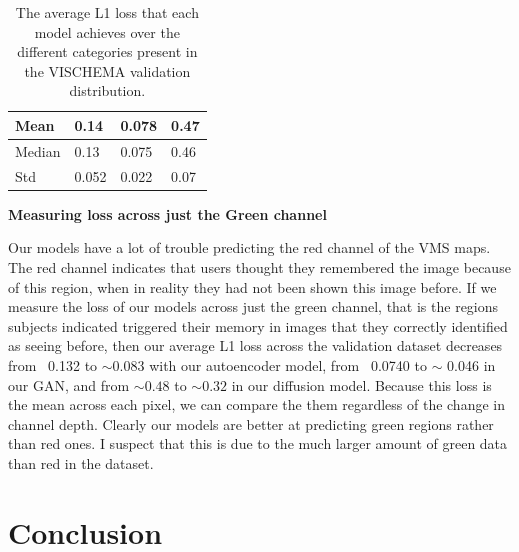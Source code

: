 \documentclass{UoYCSproject}
\begin{document}
\begin{table}[]
\begin{tabular}{|l|lll|}
        \hline
        Mean                   & \multicolumn{1}{l|}{0.14}        & \multicolumn{1}{l|}{0.078}& 0.47                                    \\ \hline
        Median                 & \multicolumn{1}{l|}{0.13}        & \multicolumn{1}{l|}{0.075}& 0.46                                    \\ \hline
        Std                    & \multicolumn{1}{l|}{0.052}       & \multicolumn{1}{l|}{0.022}& 0.07                                    \\ \hline
    \end{tabular}
    \label{tab:categories}
    \caption{The average L1 loss that each model achieves over the different categories present in the VISCHEMA validation distribution.}
\end{table}

\textbf{Measuring loss across just the Green channel}

Our models have a lot of trouble predicting the red channel of the VMS maps. The red channel indicates that users thought they remembered the image because of this region, when in reality they had not been shown this image before. If we measure the loss of our models across just the green channel, that is the regions subjects indicated triggered their memory in images that they correctly identified as seeing before, 
then our average L1 loss across the validation dataset decreases from ~0.132 to \(\sim \)0.083 with our autoencoder model, 
from ~0.0740 to \(\sim \) 0.046 in our GAN, 
and from \(\sim 0.48 \) to \(\sim 0.32 \) in our diffusion model.
Because this loss is the mean across each pixel, we can compare the them regardless of the change in channel depth. Clearly our models are better at predicting green regions rather than red ones. I suspect that this is due to the much larger amount of green data than red in the dataset.

\chapter{Conclusion}


\end{document}
